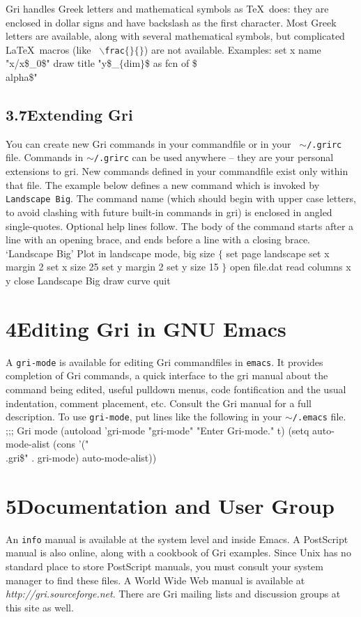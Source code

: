 Gri handles Greek letters and mathematical symbols as \TeX\ does: they
are enclosed in dollar signs and have backslash as the first
character.  Most Greek letters are available, along with several
mathematical symbols, but complicated La\TeX\ macros (like {\tt
$\backslash$frac$\lbrace\rbrace\lbrace\rbrace$}) are not available.
Examples:
\beginexample
set x name "x/x\$_0\$"
draw title "y\$_$\lbrace$dim$\rbrace$\$ as fcn of \$\\alpha\$"
\endexample



\subsection{3.7\quad Extending Gri}
You can create new Gri commands in your commandfile or in your {\tt
$\sim$/.grirc} file.  Commands in {\tt $\sim$/.grirc} can be used
anywhere -- they are your personal extensions to gri.  New commands
defined in your commandfile exist only within that file.  The example
below defines a new command which is invoked by {\tt Landscape Big}.
The command name (which should begin with upper case letters, to avoid
clashing with future built-in commands in gri) is enclosed in angled
single-quotes.  Optional help lines follow.  The body of the command
starts after a line with an opening brace, and ends before a line with
a closing brace.
\beginexample
`Landscape Big'
Plot in landscape mode, big size
$\lbrace$
    set page landscape
    set x margin 2
    set x size 25
    set y margin 2
    set y size 15
$\rbrace$
open file.dat
read columns x y
close
Landscape Big
draw curve
quit
\endexample

\section{4\quad Editing Gri in GNU Emacs}
A {\tt gri-mode} is available for editing Gri commandfiles in {\tt emacs}.
It provides completion of Gri commands, a quick interface to the gri manual
about the command being edited, useful pulldown menus, code
fontification and the usual indentation, comment placement, etc.
Consult the Gri manual for a full description.  To use {\tt gri-mode}, put
lines like the following in your {\tt $\sim$/.emacs} file.
\beginexample
;;; Gri mode
(autoload 'gri-mode "gri-mode" "Enter Gri-mode." t)
(setq auto-mode-alist 
    (cons '("\\.gri\$" . gri-mode) auto-mode-alist))
\endexample

\section{5\quad Documentation and User Group}
An {\tt info} manual is available at the system level and inside
Emacs.  A PostScript manual is also online, along with a cookbook of
Gri examples.  Since Unix has no standard place to store PostScript
manuals, you must consult your system manager to find these files.  A
World Wide Web manual is available at {\it
  http://gri.sourceforge.net}.
There are Gri mailing lists and discussion groups at this site as
well.


